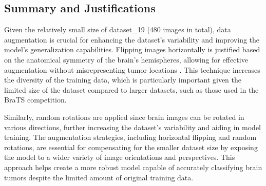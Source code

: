 \subsection{Summary and Justifications}

Given the relatively small size of dataset\_19 (480 images in total), data augmentation is crucial for enhancing the dataset's variability and improving the model's generalization capabilities. Flipping images horizontally is justified based on the anatomical symmetry of the brain's hemispheres, allowing for effective augmentation without misrepresenting tumor locations \cite{nalepa_data_2019}. This technique increases the diversity of the training data, which is particularly important given the limited size of the dataset compared to larger datasets, such as those used in the BraTS competition.

Similarly, random rotations are applied since brain images can be rotated in various directions, further increasing the dataset's variability and aiding in model training. The augmentation strategies, including horizontal flipping and random rotations, are essential for compensating for the smaller dataset size by exposing the model to a wider variety of image orientations and perspectives. This approach helps create a more robust model capable of accurately classifying brain tumors despite the limited amount of original training data.

